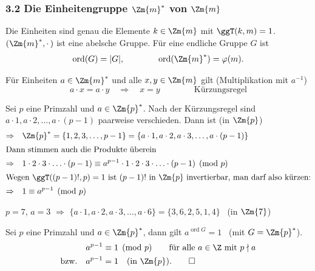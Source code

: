 \subsubsection*{3.2 Die Einheitengruppe $\Zm{m}^*$ von $\Zm{m}$}


\begin{bemerkung}
Die Einheiten sind genau die Elemente $k \in \Zm{m}$ mit $\ggT(k, m) = 1$.\\
$(\Zm{m}^*, \cdot\,)$ ist eine abelsche Gruppe. Für eine endliche Gruppe $G$ ist
\[
  \operatorname{ord}(G) = |G|, \qquad\qquad \operatorname{ord}(\Zm{m}^*) = \varphi(m).
\]
\end{bemerkung}

\begin{bemerkung}[Kürzungsregel]
Für Einheiten $a \in \Zm{m}^*$ und alle $x, y \in \Zm{m}$ gilt (Multiplikation mit $a^{-1}$)
\[
  a \cdot x = a \cdot y \quad \Rightarrow \quad x = y \qquad\qquad \text{Kürzungsregel}
\]
\end{bemerkung}

Sei $p$ eine Primzahl und $a \in \Zm{p}^*$. Nach der Kürzungsregel sind $a \cdot 1, a \cdot 2, \ldots, a \cdot (p - 1)$ paarweise verschieden. Dann ist (in $\Zm{p}$)
\begin{align*}
  \Rightarrow\quad & \Zm{p}^* = \{1, 2, 3, \ldots, p - 1\} = \{a \cdot 1, a \cdot 2, a \cdot 3, \ldots, a \cdot (p - 1)\} \\
  \intertext{Dann stimmen auch die Produkte überein}
  \Rightarrow\quad & 1 \cdot 2 \cdot 3 \cdot \ldots \cdot (p - 1) \equiv a^{p-1} \cdot 1 \cdot 2 \cdot 3 \cdot \ldots \cdot (p - 1) \pmod{p} \\
  \intertext{Wegen $\ggT((p - 1)!, p) = 1$ ist $(p - 1)!$ in $\Zm{p}$ invertierbar, man darf also kürzen:}
  \Rightarrow\quad & 1 \equiv a^{p-1} \pmod{p}
\end{align*}

\begin{beispiel}
$p = 7$, $a = 3$ $\Rightarrow$ $\{a \cdot 1, a \cdot 2, a \cdot 3, \ldots, a \cdot 6\} = \{3, 6, 2, 5, 1, 4\}$ \ (in $\Zm{7}$)
\end{beispiel}

\begin{satz}[Fermat]
Sei $p$ eine Primzahl und $a \in \Zm{p}^*$, dann gilt \hfill $a^{\operatorname{ord} G} = 1$ \ (mit $G = \Zm{p}^*$).
\begin{align*}
  & a^{p-1} \equiv 1 \pmod{p} \qquad \text{für alle } a \in \Z \text{ mit } p \nmid a \\
  \text{bzw.}\quad & a^{p-1} = 1 \quad (\text{in } \Zm{p}). \qquad \square
\end{align*}
\end{satz}

